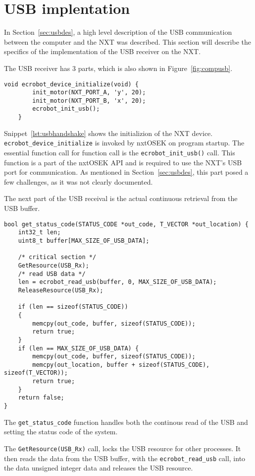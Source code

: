 \section{USB implentation}
\label{sec:usbimp}
In Section~\ref{sec:usbdes}, a high level description of the USB communication between the computer and the NXT was described.
This section will describe the specifics of the implementation of the USB receiver on the NXT.

The USB receiver has 3 parts, which is also shown in Figure~\ref{fig:compusb}.

\begin{lstlisting}[language=CSharp,label={lst:usbhandshake},caption={ecrobot\_device\_initialize method from nxt.c}]
    void ecrobot_device_initialize(void) {
        init_motor(NXT_PORT_A, 'y', 20);
        init_motor(NXT_PORT_B, 'x', 20);
        ecrobot_init_usb();
    }
\end{lstlisting}
Snippet~\ref{lst:usbhandshake} shows the initializion of the NXT device.
\texttt{ecrobot\_device\_initialize} is invoked by nxtOSEK on program startup.
The essential function call for function call is the \texttt{ecrobot\_init\_usb()} call.
This function is a part of the nxtOSEK API and is required to use the NXT's USB port for communication.
As mentioned in Section~\ref{sec:usbdes}, this part posed a few challenges, as it was not clearly documented.

The next part of the USB receival is the actual continuous retrieval from the USB buffer.
\begin{lstlisting}[language=CSharp,label={lst:usbreceive},caption={get\_status\_code method from usb.c}]
bool get_status_code(STATUS_CODE *out_code, T_VECTOR *out_location) {
	int32_t len;
	uint8_t buffer[MAX_SIZE_OF_USB_DATA];

	/* critical section */
	GetResource(USB_Rx);
	/* read USB data */
	len = ecrobot_read_usb(buffer, 0, MAX_SIZE_OF_USB_DATA);
	ReleaseResource(USB_Rx);

	if (len == sizeof(STATUS_CODE))
	{
		memcpy(out_code, buffer, sizeof(STATUS_CODE));
		return true;
	}
	if (len == MAX_SIZE_OF_USB_DATA) {
		memcpy(out_code, buffer, sizeof(STATUS_CODE));
		memcpy(out_location, buffer + sizeof(STATUS_CODE), sizeof(T_VECTOR));
		return true;
	}
	return false;
}
\end{lstlisting}
The \texttt{get\_status\_code} function handles both the continous read of the USB and setting the status code of the system.

The \texttt{GetResource(USB\_Rx)} call, locks the USB resource for other processes.
It then reads the data from the USB buffer, with the \texttt{ecrobot\_read\_usb} call, into the data unsigned integer data and releases the USB resource.

